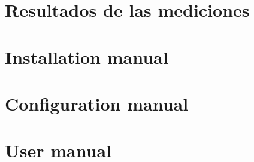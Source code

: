 \section{Resultados de las mediciones}
\label{anexo:resultados_mediciones}


\section{Installation manual}
\label{anexo_manual_instalacion}


\section{Configuration manual}
\label{anexo_manual_configuracion}


\section{User manual}
\label{anexo_manual_usuario}



